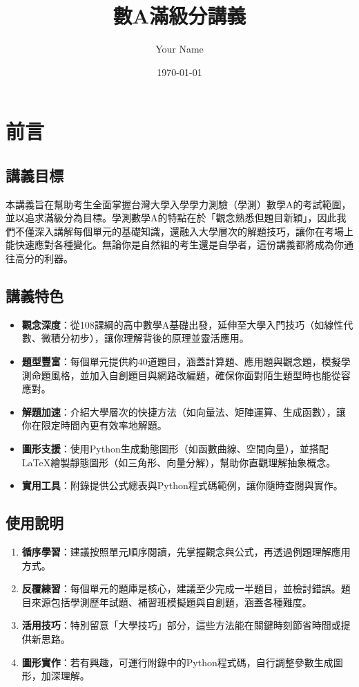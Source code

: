 \documentclass[a4paper,12pt]{report}
\title{數A滿級分講義}
\author{Your Name}
\date{\today}
\begin{document}
\maketitle
\tableofcontents

\chapter*{前言}

\section*{講義目標}
本講義旨在幫助考生全面掌握台灣大學入學學力測驗（學測）數學A的考試範圍，並以追求滿級分為目標。學測數學A的特點在於「觀念熟悉但題目新穎」，因此我們不僅深入講解每個單元的基礎知識，還融入大學層次的解題技巧，讓你在考場上能快速應對各種變化。無論你是自然組的考生還是自學者，這份講義都將成為你通往高分的利器。

\section*{講義特色}
\begin{itemize}
    \item \textbf{觀念深度}：從108課綱的高中數學A基礎出發，延伸至大學入門技巧（如線性代數、微積分初步），讓你理解背後的原理並靈活應用。
    \item \textbf{題型豐富}：每個單元提供約40道題目，涵蓋計算題、應用題與觀念題，模擬學測命題風格，並加入自創題目與網路改編題，確保你面對陌生題型時也能從容應對。
    \item \textbf{解題加速}：介紹大學層次的快捷方法（如向量法、矩陣運算、生成函數），讓你在限定時間內更有效率地解題。
    \item \textbf{圖形支援}：使用Python生成動態圖形（如函數曲線、空間向量），並搭配LaTeX繪製靜態圖形（如三角形、向量分解），幫助你直觀理解抽象概念。
    \item \textbf{實用工具}：附錄提供公式總表與Python程式碼範例，讓你隨時查閱與實作。
\end{itemize}

\section*{使用說明}
\begin{enumerate}
    \item \textbf{循序學習}：建議按照單元順序閱讀，先掌握觀念與公式，再透過例題理解應用方式。
    \item \textbf{反覆練習}：每個單元的題庫是核心，建議至少完成一半題目，並檢討錯誤。題目來源包括學測歷年試題、補習班模擬題與自創題，涵蓋各種難度。
    \item \textbf{活用技巧}：特別留意「大學技巧」部分，這些方法能在關鍵時刻節省時間或提供新思路。
    \item \textbf{圖形實作}：若有興趣，可運行附錄中的Python程式碼，自行調整參數生成圖形，加深理解。
\end{enumerate}
\end{document}
